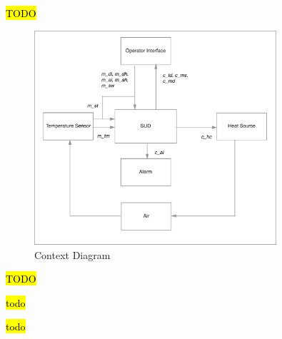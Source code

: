 \documentclass[fontsize=12pt,paper=letter,twoside]{scrartcl}
\begin{document}

\newpage


\hl{TODO}



\begin{figure}[!htb]
\begin{center}
\includegraphics[width=0.8\textwidth]{pics/ContextDiagramExpanded.pdf}
\end{center}
\caption{Context Diagram}
\label{fig:modes}
\end{figure}

\hl{TODO}


\newpage
\hl{todo}


\newpage

\hl{todo}


\newpage




\newpage


\end{document}
